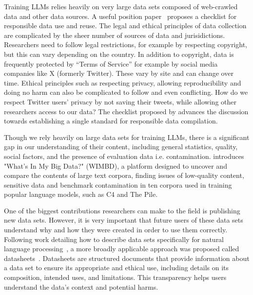 \noindent Training LLMs relies heavily on very large data sets composed of web-crawled data and other data sources.  
A useful position paper~\cite{rogers_just_2021} proposes a checklist for responsible data use and reuse. 
The legal and ethical principles of data collection are complicated by the sheer number of sources of data and jurisidictions. Researchers need to follow legal restrictions, for example by respecting copyright, but this can vary depending on the country.
In addition to copyright, data is frequently protected by ``Terms of Service'' for example by social media companies like X (formerly Twitter). These vary by site and can change over time. Ethical principles such as respecting privacy, allowing reproducibility and doing no harm can also be complicated to follow and even conflicting. How do we respect Twitter users' privacy by not saving their tweets, while allowing other researchers access to our data? The checklist proposed by \citet{rogers_just_2021} advances the discussion towards establishing a single standard for responsible data compilation.

Though we rely heavily on large data sets for training LLMs, there is a significant gap in our understanding of their content, including general statistics, quality, social factors, and the presence of evaluation data i.e. contamination. \citet{elazar_whats_2024} introduces "What's In My Big Data?" (WIMBD), a platform designed to uncover and compare the contents of large text corpora, finding issues of low-quality content, sensitive data and benchmark contamination in ten corpora used in training popular language models, such as C4 and The Pile.
 
One of the biggest contributions researchers can make to the field is publishing new data sets. However, it is very important that future users of these data sets understand why and how they were created in order to use them correctly. Following work detailing how to describe data sets specifically for natural language processing~\cite{bender_data_2018}, a more broadly applicable approach was proposed called datasheets~\citep{gebru_datasheets_2020}. Datasheets are structured documents that provide information about a data set to ensure its appropriate and ethical use, including details on its composition, intended uses, and limitations. This transparency helps users understand the data's context and potential harms.

